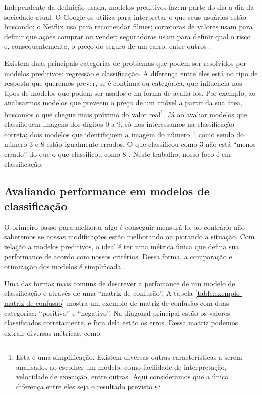 \documentclass[a4paper,titlepage]{ppgi}\usepackage[]{graphicx}\usepackage[]{color}
\begin{document}
Independente da definição usada, modelos preditivos fazem parte do dia-a-dia da
sociedade atual. O Google os utiliza para interpretar o que seus usuários estão
buscando; o Netflix usa para recomendar filmes; corretoras de valores usam para
definir que ações comprar ou vender; seguradoras usam para definir qual o risco
e, consequentemente, o preço do seguro de um carro, entre outros
\cite{Levy2010}.

Existem duas principais categorias de problemas que podem ser resolvidos por
modelos preditivos: regressão e classificação. A diferença entre eles está no
tipo de resposta que queremos prever, se é contínua ou categórica, que
influencia nos tipos de modelos que podem ser usados e na forma de avaliá-los.
Por exemplo, ao analisarmos modelos que preveem o preço de um imóvel a partir
da sua área, buscamos o que chegue mais próximo do valor real\footnote{Esta é
uma simplificação. Existem diversas outras características a serem analisados
ao escolher um modelo, como facilidade de interpretação, velocidade de
execução, entre outras. Aqui consideramos que a única diferença entre eles seja
o resultado previsto.}. Já ao avaliar modelos que classifiquem imagens dos
dígitos 0 a 9, só nos interessamos na classificação correta; dois modelos que
identifiquem a imagem do número 1 como sendo do número 3 e 8 estão igualmente
errados. O que classificou como 3 não está ``menos errado'' do que o que
classificou como 8 \cite{Kuhn2013,Zumel2014}. Neste trabalho, nosso foco é em
classificação.

\subsection{Avaliando performance em modelos de classificação}

O primeiro passo para melhorar algo é conseguir mensurá-lo, ao contrário não
saberemos se nossas modificações estão melhorando ou piorando a situação. Com
relação a modelos preditivos, o ideal é ter uma métrica única que defina sua
performance de acordo com nossos critérios. Dessa forma, a comparação e
otimização dos modelos é simplificada \cite{Ng2012}.

Uma das formas mais comuns de descrever a perfomance de um modelo de
classificação é através de uma ``matriz de confusão''. A tabela
\ref{table:exemplo-matriz-de-confusao} mostra um exemplo de matriz de confusão
com duas categorias: ``positivo'' e ``negativo''. Na diagonal principal estão
os valores classificados corretamente, e fora dela estão os erros. Dessa matriz
podemos extrair diversas métricas, como:
\end{document}
